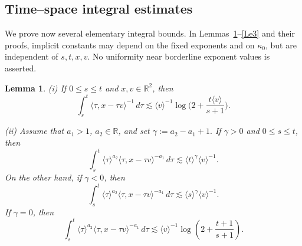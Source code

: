 \documentclass[reqno,11pt]{amsart}
\numberwithin{equation}{section}
\def\R{{\mathbb R}}
\def\R{{\bf R}}
\def\R{\mathbb{R}}
\newtheorem{lemma}[theorem]{Lemma}
\begin{document}
	\subsection{Time–space integral estimates}
	We prove now several elementary integral bounds.
	In Lemmas~\ref{z216}--\ref{Le3} and their proofs, implicit constants
	may depend on the fixed exponents and on $\kappa_0$, but are independent
	of $s,t,x,v$. No uniformity near borderline exponent values is asserted.

	
	\begin{lemma}\label{z216}
		(i) If $0\le s\le t$ and $x,v\in\R^2$, then
		\begin{equation*}
			\int_s^t \langle\tau,x-\tau v\rangle^{-1}\,d\tau
			\lesssim
			\langle v\rangle^{-1}\log\!\Big(2+\frac{t\langle v\rangle}{s+1}\Big).
		\end{equation*}
		
		(ii) Assume that $a_1>1$, $a_2\in\mathbb R$, and set
			$\gamma:=a_2-a_1+1.$
	 If $\gamma>0$ and $0\leq s\leq t$, then
		\begin{equation}\label{z210}
			\int_s^t\langle\tau\rangle^{a_2}\langle\tau,x-\tau v\rangle^{-a_1}\,d\tau\lesssim\langle t\rangle^{\gamma}
			\langle v\rangle^{-1}.
		\end{equation}
		On the other hand, if $\gamma<0$, then \begin{equation}\label{z212}
			\int_s^t
			\langle\tau\rangle^{a_2}
			\langle\tau,x-\tau v\rangle^{-a_1}\,d\tau
			\lesssim
			\langle s\rangle^{\gamma}
			\langle v\rangle^{-1}.
		\end{equation}
	If $\gamma=0$, then
		\begin{equation}\label{z212-borderline}
			\int_s^t\langle\tau\rangle^{a_2}
			\langle\tau,x-\tau v\rangle^{-a_1}\,d\tau
			\lesssim\langle v\rangle^{-1}
			\log\!\left(2+\frac{t+1}{s+1}\right).
		\end{equation}
	\end{lemma}
	
\end{document}
